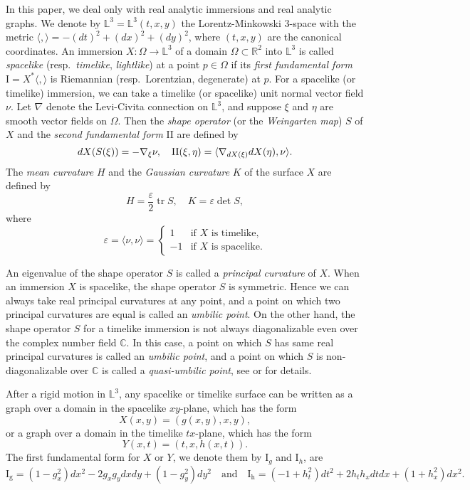 \documentclass[12pt,amstex]{amsart}%
\theoremstyle{plain} %
\theoremstyle{definition}
\DeclareMathOperator{\tr}{tr}
\begin{document}
In this paper, we deal only with real analytic immersions and real analytic graphs. We denote by $\mathbb{L}^3=\mathbb{L}^3(t,x,y)$ the Lorentz-Minkowski 3-space with the metric $\langle , \rangle =-(dt)^2+(dx)^2+(dy)^2$, where $(t, x, y)$ are the canonical coordinates. An immersion $ X\colon \Omega\rightarrow \mathbb{L}^3$ of a domain $\Omega \subset \mathbb{R}^2$ into $\mathbb{L}^3$ is called {\it spacelike} (resp.\ {\it timelike}, {\it lightlike}) at a point $p\in \Omega$ if its {\it first fundamental form} $\mathrm{I}=X^*{\langle , \rangle}$ is Riemannian (resp.\ Lorentzian, degenerate) at $p$. For a spacelike (or timelike) immersion, we can take a timelike (or spacelike) unit normal vector field $\nu$. Let $ \nabla $ denote the Levi-Civita connection on $ \mathbb{L}^3 $, and suppose $\xi$ and $\eta$ are  smooth vector fields on $\Omega$. Then the {\it shape operator} (or the {\it Weingarten map}) $S$ of $X$ and the {\it second fundamental form} $\mathrm{II}$ are defined by
 $$ dX(S(\xi))=-\nabla_{\xi}\nu,\quad {\rm II}(\xi,\eta)=\langle \nabla_{dX(\xi)}dX(\eta), \nu \rangle.$$
The {\it mean curvature} $H$ and the {\it Gaussian curvature} $K$ of the surface $X$ are defined by
 $$ H=\frac{\varepsilon}{2}\tr{S},\quad K=\varepsilon\det{S},$$%
 where 
\begin{equation*}
\varepsilon = \langle \nu,\nu \rangle=
\begin{cases}
1  & \text{if $X$ is timelike,}\\
-1 & \text{if $X$ is spacelike.}
\end{cases}
\end{equation*} 

An eigenvalue of the shape operator $S$ is called a {\it principal curvature} of $X$. When an immersion $X$ is spacelike, the shape operator $S$ is symmetric. Hence we can always take real principal curvatures at any point, and a point on which two principal curvatures are equal is called an {\it umbilic point}. On the other hand, the shape operator $S$ for a timelike immersion is not always diagonalizable even over the complex number field $\mathbb{C}$. In this case, a point on which $S$ has same real principal curvatures is called an {\it umbilic point}, and a point on which $S$ is non-diagonalizable over $\mathbb{C}$ is called a {\it quasi-umbilic point}, see \cite{Clelland} or \cite{A2} for details. 


After a rigid motion in $\mathbb{L}^3$, any spacelike or timelike surface can be written as a graph over a domain in the spacelike $xy$-plane, which has the form 
      $$ X(x,y)=(g(x,y),x,y),$$ 
  or a graph over a domain in the timelike $tx$-plane, which has the form
      $$ Y(x,t)=(t,x,h(x,t)). $$ 
The first fundamental form for $X$ or $Y$, we denote them by $\mathrm{I}_g$ and $\mathrm{I}_h$, are
 \[
\mathrm{I_g}=(1-g_x^2)dx^2-2g_xg_ydxdy+(1-g_y^2)dy^2\quad \text{and}\quad \mathrm{I_h}=(-1+h_t^2)dt^2+2h_th_xdtdx+(1+h_x^2)dx^2.
\]
\end{document}
